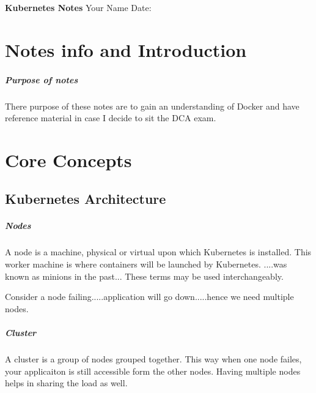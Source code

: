 \documentclass[11pt]{book}
\begin{document}
    \begin{titlepage}
        \centering
        \vspace*{2in}
        \Huge \textbf{Kubernetes Notes}
        \vfill
        \Large Your Name
        \vfill
        \Large Date: %
    \end{titlepage}

    \newpage

    \tableofcontents
    \newpage


    \chapter{Notes info and Introduction}

    \paragraph{Purpose of notes}
    There purpose of these notes are to gain an understanding of Docker and have reference material in case I decide to sit the DCA exam.


    \chapter{Core Concepts}


    \section{Kubernetes Architecture}

    \paragraph{Nodes}
    A node is a machine, physical or virtual upon which Kubernetes is installed.
    This worker machine is where containers will be launched by Kubernetes.
    ....was known as minions in the past...
    These terms may be used interchangeably.

    Consider a node failing.....application will go down.....hence we need multiple nodes.

    \paragraph{Cluster}
    A cluster is a group of nodes grouped together. This way when one node failes, your applicaiton is still accessible form the other nodes.
    Having multiple nodes helps in sharing the load as well.
\end{document}
